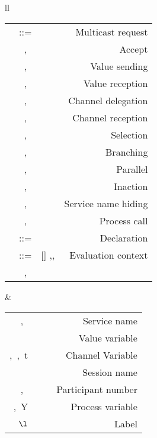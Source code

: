 \documentclass[a4paper]{article}
\begin{document}
\begin{table}[tb]
\centering
\begin{tabular}{ll}
\begin{tabular}{rclr}
 \PP & ::=  & \sr\uu \pn\y\PP   &   {Multicast request}\\
     & \sep & \sa\uu\p\y\PP   &   {Accept}\\
     & \sep &  \out{\cc}\p\e\PP & {Value sending}\\
      & \sep & \inp{\cc}\x\p\PP &{Value reception}\\
      & \sep & \sd{\cc}{\cc'}{\p} \PP & {Channel delegation}\\
      & \sep & \rd{\cc}\y\q\PP &{Channel reception}\\
      & \sep & \lsel{\cc}{\p}{l}{\PP} &{Selection}\\
      & \sep & \lbranch{\cc}{\p} & {Branching}\\
      & \sep & \PP \pc \Q  &{Parallel}\\
      & \sep & \inact & {Inaction}\\
      & \sep & \nuc{\Ia}{\PP} & {Service name hiding}\\
      & \sep & \proccall{\X}{\e}{\cc} & {Process call}
\\
      \DD   & ::= & \Ddef &{Declaration}\\
      \E   & ::= &[\;] \sep\PP\sep\nuc{\Ia}{\E}&{Evaluation context}\\
      & \sep &\E \pc \E\\
\end{tabular}
&
\begin{tabular}{rclr}
\Ia,~\Ib & &  & Service name \\
\x  & & & Value variable \\
\y,~\z,~t  & & & Channel Variable \\
\s  & & & Session name\\
\p,~\q & & & Participant number\\
\X,~Y & & & Process variable \\
$\l$ & & & Label \\

\end{tabular}
\end{tabular}
\end{table}
\end{document}
